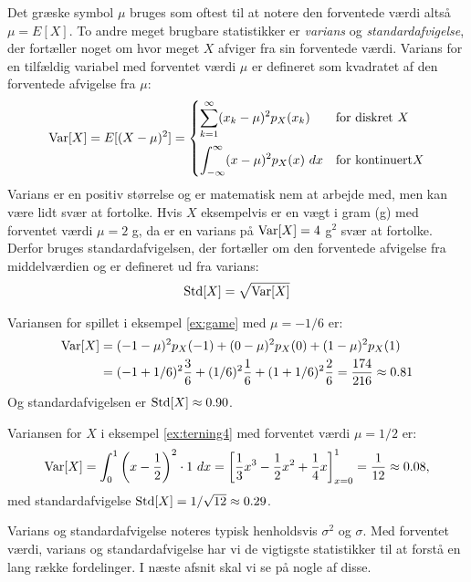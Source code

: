 Det græske symbol $\mu$ bruges som oftest til at notere den forventede værdi altså $\mu = E[X]$. To andre meget brugbare statistikker er \emph{varians} og \emph{standardafvigelse}, der fortæller noget om hvor meget $X$ afviger fra sin forventede værdi. Varians for en tilfældig variabel med forventet værdi $\mu$ er defineret som kvadratet af den forventede afvigelse fra $\mu$: 
\begin{align*}
\operatorname{Var}[X] = E[(X - \mu)^2] = \begin{cases}
\displaystyle \sum_{k = 1}^{\infty} (x_k - \mu)^2p_X(x_k) & \text{for diskret } X \\[15pt]
 \displaystyle \int_{-\infty}^{\infty} (x - \mu)^2p_X(x) \ dx & \text{for kontinuert} X 
\end{cases}
\end{align*}
Varians er en positiv størrelse og er matematisk nem at arbejde med, men kan være lidt svær at fortolke. Hvis $X$ eksempelvis er en vægt i gram (g) med forventet værdi $\mu = 2$ g, da er en varians på  $\operatorname{Var}[X] = 4$ g$^2$ svær at fortolke. Derfor bruges standardafvigelsen, der fortæller om den forventede afvigelse fra middelværdien og er defineret ud fra varians:
\begin{align*}
\operatorname*{Std}[X] = \sqrt{\operatorname{Var}[X]}
\end{align*}
\begin{example}
Variansen for spillet i eksempel \ref{ex:game} med $\mu = - 1/6$ er:
\begin{align*}
\operatorname{Var}[X] &= (-1 - \mu)^2p_X(-1) + (0 - \mu)^2p_X(0) + (1 - \mu)^2p_X(1) \\
 &= (-1 + 1/6)^2\frac{3}{6} + (1/6)^2\frac{1}{6} + (1 + 1/6)^2\frac{2}{6} = \frac{174}{216} \approx 0.81
\end{align*}
Og standardafvigelsen er $\operatorname*{Std}[X] \approx 0.90$. 
\end{example}
\begin{example}
Variansen for $X$ i eksempel \ref{ex:terning4} med forventet værdi $\mu = 1/2$ er:
\begin{align*}
\operatorname{Var}[X] = \int_0^1 \left(x - \frac{1}{2}\right)^2 \cdot 1 \ dx = \left[\frac{1}{3}x^3 - \frac{1}{2}x^2 + \frac{1}{4}x \right]_{x = 0}^{1} = \frac{1}{12} \approx 0.08,
\end{align*}
med standardafvigelse $\operatorname*{Std}[X] = 1/\sqrt{12} \approx 0.29$. 
\end{example}
Varians og standardafvigelse noteres typisk henholdsvis $\sigma^2$ og $\sigma$. Med forventet værdi, varians og standardafvigelse har vi de vigtigste statistikker til at forstå en lang række fordelinger. I næste afsnit skal vi se på nogle af disse. 